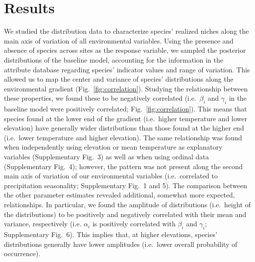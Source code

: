 \documentclass[11pt, a4paper]{article}
\begin{document}
\section*{Results}
We studied the distribution data to characterize species' realized niches along the main axis of variation of all environmental variables. Using the presence and absence of species across sites as the response variable, we sampled the posterior distributions of the baseline model, accounting for the information in the attribute database regarding species' indicator values and range of variation. This allowed us to map the center and variance of species' distributions along the environmental gradient (Fig.~\ref{fig:correlation}).  Studying the relationship between these properties, we found these to be negatively correlated (i.e.~$\beta_{i}$ and $\gamma_{i}$ in the baseline model were positively correlated; Fig.~\ref{fig:correlation}). This means that species found at the lower end of the gradient (i.e.~higher temperature and lower elevation) have generally wider distributions than those found at the higher end (i.e.~lower temperature and higher elevation). The same relationship was found when independently using elevation or mean temperature as explanatory variables (Supplementary Fig.~3) as well as when using ordinal data (Supplementary Fig.~4); however, the pattern was not present along the second main axis of variation of our environmental variables (i.e.~correlated to precipitation seasonality; Supplementary Fig.~1 and 5). The comparison between the other parameter estimates revealed additional, somewhat more expected, relationships. In particular, we found the amplitude of distributions (i.e.~height of the distributions) to be positively and negatively correlated with their mean and variance, respectively (i.e. $\alpha_{i}$ is positively correlated with $\beta_{i}$ and $\gamma_{i}$; Supplementary Fig.~6). This implies that, at higher elevations, species' distributions generally have lower amplitudes (i.e.~lower overall probability of occurrence).
\end{document}
